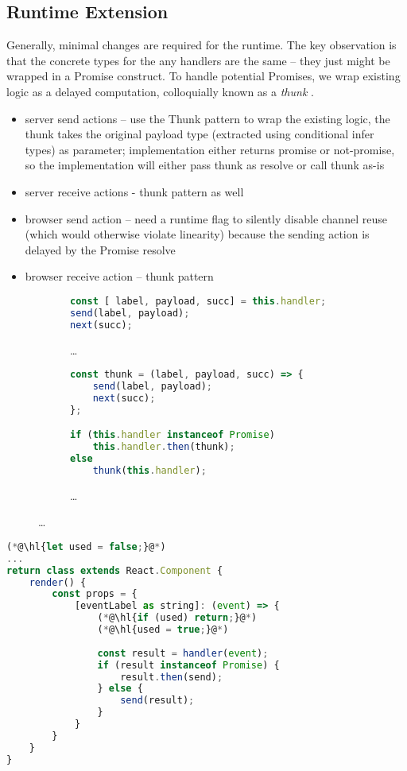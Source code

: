 \subsection{Runtime Extension}

Generally, minimal changes are required for the runtime.
The key observation is that the concrete types for the any
handlers are the same -- they just might be wrapped in a Promise
construct.
To handle potential Promises, we wrap existing logic
as a delayed computation, colloquially known as a \textit{thunk}
\cite{Thunk}.

\begin{itemize}
\item server send actions -- use the Thunk pattern to wrap the existing logic, the thunk takes the original payload type (extracted using conditional infer types) as parameter; implementation either returns promise or not-promise, so the implementation will either pass thunk as resolve or call thunk as-is
\item server receive actions - thunk pattern as well
\item browser send action -- need a runtime flag to silently disable channel reuse (which would otherwise violate linearity) because the sending action is delayed by the Promise resolve
\item browser receive action -- thunk pattern
\end{itemize}

\begin{figure}[!h]
\begin{subfigure}{\textwidth}
\begin{lstlisting}[language=javascript,tabsize=2]
const [	label, payload, succ] = this.handler;
send(label, payload);
next(succ);
\end{lstlisting}
\caption{\dots}
\end{subfigure}
\hfill
\begin{subfigure}{\textwidth}
\begin{lstlisting}[language=javascript,tabsize=2]
const thunk = (label, payload, succ) => {
	send(label, payload);
	next(succ);	
};

if (this.handler instanceof Promise)
	this.handler.then(thunk);
else 
	thunk(this.handler);
\end{lstlisting}
\caption{\dots}
\end{subfigure}
\end{figure}

\begin{lstlisting}[language=javascript,tabsize=2]
(*@\hl{let used = false;}@*)
...
return class extends React.Component {
	render() {
		const props = {
			[eventLabel as string]: (event) => {
				(*@\hl{if (used) return;}@*)
				(*@\hl{used = true;}@*)
				
				const result = handler(event);
				if (result instanceof Promise) {
					result.then(send);				
				} else {
					send(result);				
				}
			}		
		}
	}
}
\end{lstlisting}

